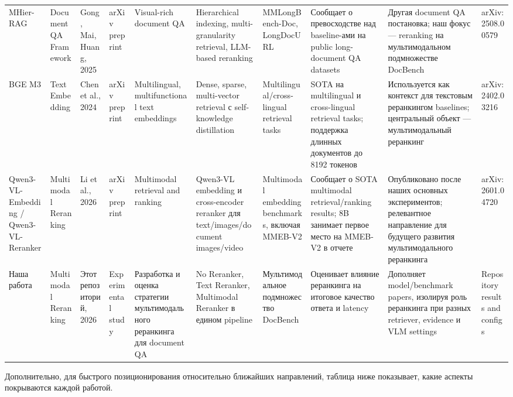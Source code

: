 \documentclass[conference]{IEEEtran}
\begin{document}
\begin{table}[t]
{\begin{tabular}{|l|l|l|l|l|l|l|l|l|l|}
MHier-RAG & Document QA Framework & Gong, Mai, Huang, 2025 & arXiv preprint & Visual-rich document QA & Hierarchical indexing, multi-granularity retrieval, LLM-based reranking & MMLongBench-Doc, LongDocURL & Сообщает о превосходстве над baseline-ами на public long-document QA datasets & Другая document QA постановка; наш фокус --- reranking на мультимодальном подмножестве DocBench & arXiv:2508.00579 \\
BGE M3 & Text Embedding & Chen et al., 2024 & arXiv preprint & Multilingual, multifunctional text embeddings & Dense, sparse, multi-vector retrieval с self-knowledge distillation & Multilingual/cross-lingual retrieval tasks & SOTA на multilingual и cross-lingual retrieval tasks; поддержка длинных документов до 8192 токенов & Используется как контекст для текстовым реранкингом baselines; центральный объект --- мультимодальный реранкинг & arXiv:2402.03216 \\
Qwen3-VL-Embedding / Qwen3-VL-Reranker & Multimodal Reranking & Li et al., 2026 & arXiv preprint & Multimodal retrieval and ranking & Qwen3-VL embedding и cross-encoder reranker для text/images/document images/video & Multimodal embedding benchmarks, включая MMEB-V2 & Сообщает о SOTA multimodal retrieval/ranking results; 8B занимает первое место на MMEB-V2 в отчете & Опубликовано после наших основных экспериментов; релевантное направление для будущего развития мультимодального реранкинга & arXiv:2601.04720 \\
Наша работа & Multimodal Reranking & Этот репозиторий, 2026 & Experimental study & Разработка и оценка стратегии мультимодального реранкинга для document QA & No Reranker, Text Reranker, Multimodal Reranker в едином pipeline & Мультимодальное подмножество DocBench & Оценивает влияние реранкинга на итоговое качество ответа и latency & Дополняет model/benchmark papers, изолируя роль реранкинга при разных retriever, evidence и VLM settings & Repository results and configs \\
\hline
\end{tabular}%
}
\end{table}

Дополнительно, для быстрого позиционирования относительно ближайших направлений, таблица ниже показывает, какие аспекты покрываются каждой работой.
\end{document}
